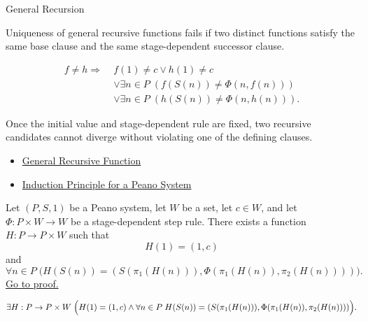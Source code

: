 \begin{topicbox}{General Recursion}
\begin{remark*}
Uniqueness of general recursive functions fails if two distinct functions
satisfy the same base clause and the same stage-dependent successor clause.
\end{remark*}

\begin{remark*}
\[
\begin{aligned}
f\neq h
\Longrightarrow\;&
f(1)\neq c\lor h(1)\neq c\\
&\lor \exists n\in P\;(f(S(n))\neq \Phi(n,f(n)))\\
&\lor \exists n\in P\;(h(S(n))\neq \Phi(n,h(n))).
\end{aligned}
\]
\end{remark*}

\begin{remark*}[Interpretation]
Once the initial value and stage-dependent rule are fixed, two recursive
candidates cannot diverge without violating one of the defining clauses.
\end{remark*}

\begin{remark*}[Dependencies]
\begin{itemize}
  \item \hyperref[def:general-recursive-function]{General Recursive Function}
  \item \hyperref[thm:induction-principle-for-peano-system]{Induction Principle for a Peano System}
\end{itemize}
\end{remark*}

\begin{tcolorbox}[colback=thmbox, colframe=thmborder, arc=2pt,
  left=6pt, right=6pt, top=4pt, bottom=4pt,
  title={\small\textbf{Theorem (General Recursion by State Encoding)}},
  fonttitle=\small\bfseries]
\begin{theorem}
\label{thm:general-recursion-by-state-encoding}
Let $(P,S,1)$ be a Peano system, let $W$ be a set, let $c\in W$, and let
$\Phi:P\times W\to W$ be a stage-dependent step rule. There exists a function
$H:P\to P\times W$ such that
\[
H(1)=(1,c)
\]
and
\[
\forall n\in P\;
\bigl(H(S(n))=(S(\pi_1(H(n))),\Phi(\pi_1(H(n)),\pi_2(H(n))))\bigr).
\]
\hyperref[prf:general-recursion-by-state-encoding]{Go to proof.}
\end{theorem}
\end{tcolorbox}

\begin{remark*}
\[
\exists H:P\to P\times W\;
\Bigl(H(1)=(1,c)\land
\forall n\in P\;
H(S(n))=(S(\pi_1(H(n))),\Phi(\pi_1(H(n)),\pi_2(H(n))))\Bigr).
\]
\end{remark*}


\end{topicbox}
